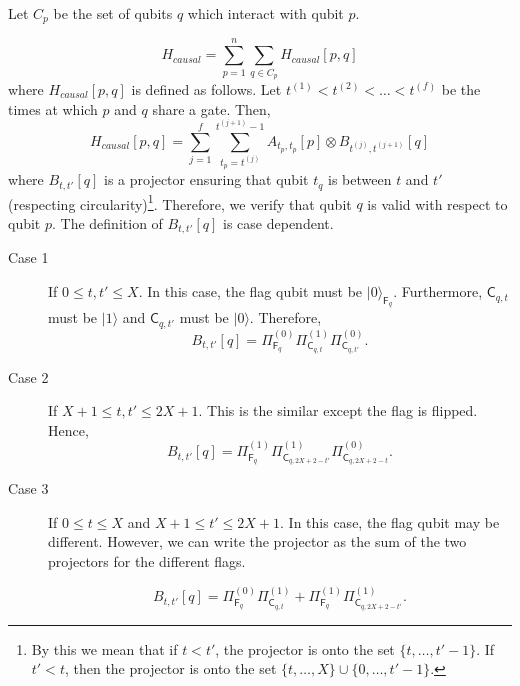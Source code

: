 \documentclass[11pt,letterpaper]{article}
\theoremstyle{definition}
\theoremstyle{remark}
\renewcommand{\leq}{\leqslant}
\numberwithin{equation}{section}
\theoremstyle{definition}
\newcommand{\ket}[1]{|#1\rangle}
\newcommand{\sC}{{\mathsf{C}}}
\newcommand{\sF}{{\mathsf{F}}}
\begin{document}
\begin{description}
Let $C_p$ be the set of qubits $q$ which interact with qubit $p$.

\begin{equation}
H_{causal} = \sum_{p = 1}^n \sum_{q \in C_p} H_{causal}[p,q]
\label{eq:causality_term}
\end{equation}
where $H_{causal}[p,q]$ is defined as follows. Let $t^{(1)} < t^{(2)} < \ldots < t^{(f)}$ be the times at which $p$ and $q$ share a gate. Then,
\begin{equation}
H_{causal}[p,q] = \sum_{j = 1}^f \sum_{t_p = t^{(j)}}^{t^{(j+1)} - 1} A_{t_p,t_p}[p] \otimes B_{t^{(j)}, t^{(j+1)}}[q]
\end{equation}
where $B_{t, t'}[q]$ is a projector ensuring that qubit $t_q$ is between $t$ and $t'$ (respecting circularity)\footnote{By this we mean that if $t < t'$, the projector is onto the set $\{t, \ldots, t'-1\}$. If $t' < t$, then the projector is onto the set $\{t, \ldots, X\} \cup \{0, \ldots, t' - 1\}$.}. Therefore, we verify that qubit $q$ is valid with respect to qubit $p$. The definition of $B_{t,t'}[q]$ is case dependent.

\begin{description}
\item[Case 1] If $0 \leq t, t' \leq X$. In this case, the flag qubit must be $\ket{0}_{\sF_q}$. Furthermore, $\sC_{q,t}$ must be $\ket{1}$ and $\sC_{q,t'}$ must be $\ket{0}$. Therefore,
\begin{equation}
B_{t,t'}[q] = \Pi_{\sF_q}^{(0)} \Pi_{\sC_{q,t}}^{(1)} \Pi_{\sC_{q,t'}}^{(0)}.
\end{equation}

\item[Case 2] If $X + 1 \leq t, t' \leq 2X + 1$. This is the similar except the flag is flipped. Hence,
\begin{equation}
B_{t,t'}[q] = \Pi_{\sF_q}^{(1)} \Pi_{\sC_{q,2X+2-t'}}^{(1)} \Pi_{\sC_{q,2X+2-t}}^{(0)}.
\end{equation}

\item[Case 3] If $0 \leq t \leq X$ and $X + 1 \leq t' \leq 2X + 1$. In this case, the flag qubit may be different. However, we can write the projector as the sum of the two projectors for the different flags.

\begin{equation}
B_{t,t'}[q] = \Pi_{\sF_q}^{(0)} \Pi_{\sC_{q,t}}^{(1)} + \Pi_{\sF_q}^{(1)} \Pi_{\sC_{q,2X + 2 - t'}}^{(1)} .
\end{equation}


\end{description}
\end{description}
\end{document}
